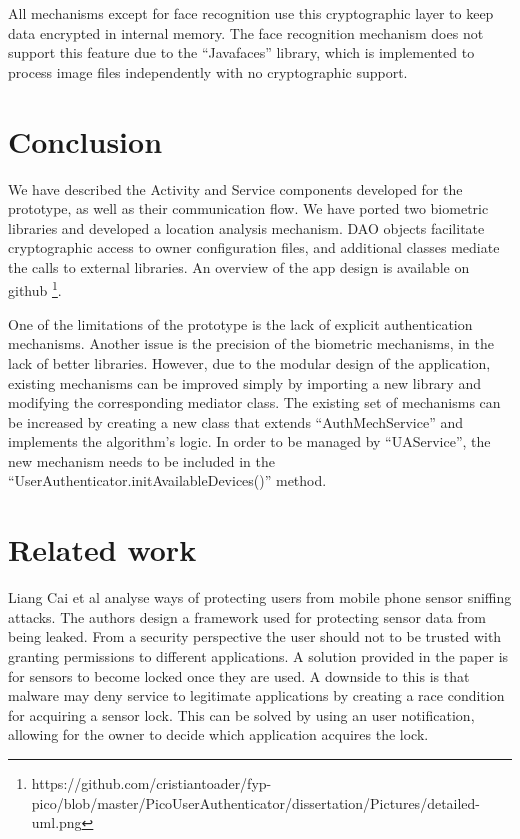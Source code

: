 All mechanisms except for face recognition use this cryptographic layer to keep data encrypted in internal memory. The face recognition mechanism does not support this feature due to the ``Javafaces'' library, which is implemented to process image files independently with no cryptographic support. 

\section{Conclusion}
We have described the Activity and Service components developed for the prototype, as well as their communication flow. We have ported two biometric libraries and developed a location analysis mechanism. DAO objects facilitate cryptographic access to owner configuration files, and additional classes mediate the calls to external libraries. An overview of the app design is available on github \footnote{https://github.com/cristiantoader/fyp-pico/blob/master/PicoUserAuthenticator/dissertation/Pictures/detailed-uml.png}.

One of the limitations of the prototype is the lack of explicit authentication mechanisms. Another issue is the precision of the biometric mechanisms, in the lack of better libraries. However, due to the modular design of the application, existing mechanisms can be improved simply by importing a new library and modifying the corresponding mediator class. The existing set of mechanisms can be increased by creating a new class that extends ``AuthMechService'' and implements the algorithm's logic. In order to be managed by ``UAService'', the new mechanism needs to be included in the ``UserAuthenticator.initAvailableDevices()'' method.

\section{Related work}
Liang Cai et al \cite{cai2009defending} analyse ways of protecting users from mobile phone sensor sniffing attacks. The authors design a framework used for protecting sensor data from being leaked. From a security perspective the user should not to be trusted with granting permissions to different applications. A solution provided in the paper is for sensors to become locked once they are used. A downside to this is that malware may deny service to legitimate applications by creating a race condition for acquiring a sensor lock. This can be solved by using an user notification, allowing for the owner to decide which application acquires the lock.

